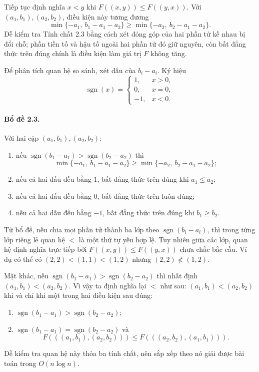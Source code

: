 \documentclass[11pt]{article}
\begin{document}
Tiếp tục định nghĩa $x<y$ khi $F((x,y))\le F((y,x))$. Với
$(a_1,b_1),(a_2,b_2)$, điều kiện này tương đương
\[
  \min\{-a_1,\ b_1-a_1-a_2\}
  \ge
  \min\{-a_2,\ b_2-a_1-a_2\}.
\]
Dễ kiểm tra Tính chất 2.3 bằng cách xét đóng góp của hai phần tử kề nhau bị đổi
chỗ; phần tiền tố và hậu tố ngoài hai phần tử đó giữ nguyên, còn bất đẳng thức
trên đúng chính là điều kiện làm giá trị $F$ không tăng.

Để phân tích quan hệ so sánh, xét dấu của $b_i-a_i$. Ký hiệu
\[
\operatorname{sgn}(x)=
\begin{cases}
1,&x>0,\\
0,&x=0,\\
-1,&x<0.
\end{cases}
\]

\paragraph{Bổ đề 2.3.}
Với hai cặp $(a_1,b_1),(a_2,b_2)$:
\begin{enumerate}
  \item nếu $\operatorname{sgn}(b_1-a_1)>\operatorname{sgn}(b_2-a_2)$ thì
  \[
    \min\{-a_1,\ b_1-a_1-a_2\}
    \ge
    \min\{-a_2,\ b_2-a_1-a_2\};
  \]
  \item nếu cả hai dấu đều bằng $1$, bất đẳng thức trên đúng khi $a_1\le a_2$;
  \item nếu cả hai dấu đều bằng $0$, bất đẳng thức trên luôn đúng;
  \item nếu cả hai dấu đều bằng $-1$, bất đẳng thức trên đúng khi $b_1\ge b_2$.
\end{enumerate}

Từ bổ đề, nếu chia mọi phần tử thành ba lớp theo
$\operatorname{sgn}(b_i-a_i)$, thì trong từng lớp riêng lẻ quan hệ $<$ là một
thứ tự yếu hợp lệ. Tuy nhiên giữa các lớp, quan hệ định nghĩa trực tiếp bởi
$F((x,y))\le F((y,x))$ chưa chắc bắc cầu. Ví dụ có thể có
$(2,2)<(1,1)<(1,2)$ nhưng $(2,2)\not<(1,2)$.

Mặt khác, nếu $\operatorname{sgn}(b_1-a_1)>\operatorname{sgn}(b_2-a_2)$ thì
nhất định $(a_1,b_1)<(a_2,b_2)$. Vì vậy ta định nghĩa lại $<$ như sau:
$(a_1,b_1)<(a_2,b_2)$ khi và chỉ khi một trong hai điều kiện sau đúng:
\begin{enumerate}
  \item $\operatorname{sgn}(b_1-a_1)>\operatorname{sgn}(b_2-a_2)$;
  \item $\operatorname{sgn}(b_1-a_1)=\operatorname{sgn}(b_2-a_2)$ và
  \[
    F(((a_1,b_1),(a_2,b_2)))
    \le
    F(((a_2,b_2),(a_1,b_1))).
  \]
\end{enumerate}
Dễ kiểm tra quan hệ này thỏa ba tính chất, nên sắp xếp theo nó giải được bài
toán trong $O(n\log n)$.
\end{document}
